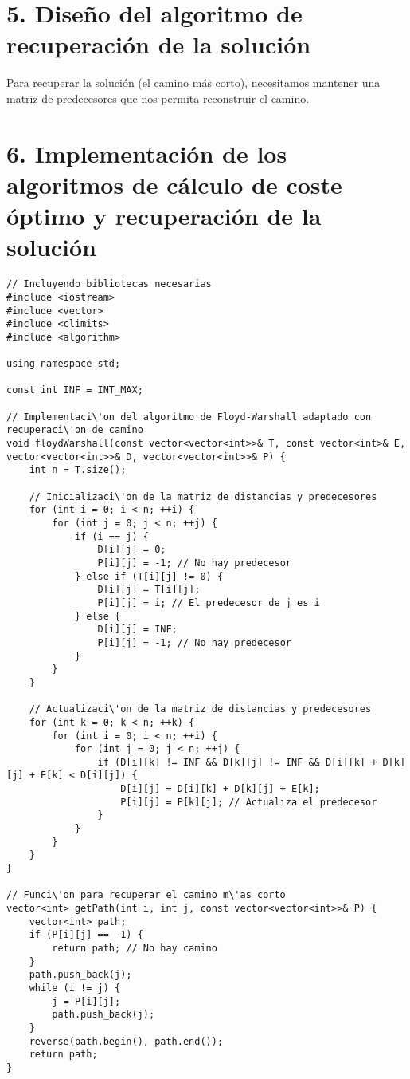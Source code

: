 \documentclass{article}
\begin{document}
\section*{5. Dise\~no del algoritmo de recuperaci\'on de la soluci\'on}

Para recuperar la soluci\'on (el camino m\'as corto), necesitamos mantener una matriz de predecesores que nos permita reconstruir el camino.

\section*{6. Implementaci\'on de los algoritmos de c\'alculo de coste \'optimo y recuperaci\'on de la soluci\'on}

\begin{lstlisting}
// Incluyendo bibliotecas necesarias
#include <iostream>
#include <vector>
#include <climits>
#include <algorithm>

using namespace std;

const int INF = INT_MAX;

// Implementaci\'on del algoritmo de Floyd-Warshall adaptado con recuperaci\'on de camino
void floydWarshall(const vector<vector<int>>& T, const vector<int>& E, vector<vector<int>>& D, vector<vector<int>>& P) {
    int n = T.size();
    
    // Inicializaci\'on de la matriz de distancias y predecesores
    for (int i = 0; i < n; ++i) {
        for (int j = 0; j < n; ++j) {
            if (i == j) {
                D[i][j] = 0;
                P[i][j] = -1; // No hay predecesor
            } else if (T[i][j] != 0) {
                D[i][j] = T[i][j];
                P[i][j] = i; // El predecesor de j es i
            } else {
                D[i][j] = INF;
                P[i][j] = -1; // No hay predecesor
            }
        }
    }

    // Actualizaci\'on de la matriz de distancias y predecesores
    for (int k = 0; k < n; ++k) {
        for (int i = 0; i < n; ++i) {
            for (int j = 0; j < n; ++j) {
                if (D[i][k] != INF && D[k][j] != INF && D[i][k] + D[k][j] + E[k] < D[i][j]) {
                    D[i][j] = D[i][k] + D[k][j] + E[k];
                    P[i][j] = P[k][j]; // Actualiza el predecesor
                }
            }
        }
    }
}

// Funci\'on para recuperar el camino m\'as corto
vector<int> getPath(int i, int j, const vector<vector<int>>& P) {
    vector<int> path;
    if (P[i][j] == -1) {
        return path; // No hay camino
    }
    path.push_back(j);
    while (i != j) {
        j = P[i][j];
        path.push_back(j);
    }
    reverse(path.begin(), path.end());
    return path;
}


\end{lstlisting}
\end{document}
